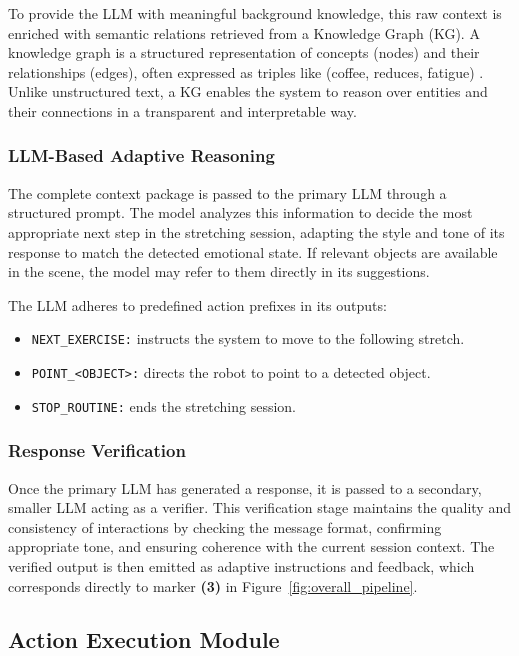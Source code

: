 To provide the LLM with meaningful background knowledge, this raw context is enriched with semantic relations retrieved from a Knowledge Graph (KG). A knowledge graph is a structured representation of concepts (nodes) and their relationships (edges), often expressed as triples like (coffee, reduces, fatigue) \cite{ref26}. Unlike unstructured text, a KG enables the system to reason over entities and their connections in a transparent and interpretable way.

\subsubsection{LLM-Based Adaptive Reasoning}

The complete context package is passed to the primary LLM through a structured prompt. The model analyzes this information to decide the most appropriate next step in the stretching session, adapting the style and tone of its response to match the detected emotional state. If relevant objects are available in the scene, the model may refer to them directly in its suggestions.

The LLM adheres to predefined action prefixes in its outputs:
\begin{itemize}
\item \texttt{NEXT\_EXERCISE:} instructs the system to move to the following stretch.
\item \texttt{POINT\_<OBJECT>:} directs the robot to point to a detected object.
\item \texttt{STOP\_ROUTINE:} ends the stretching session.
\end{itemize}

\subsubsection{Response Verification}

Once the primary LLM has generated a response, it is passed to a secondary, smaller LLM acting as a verifier. This verification stage maintains the quality and consistency of interactions by checking the message format, confirming appropriate tone, and ensuring coherence with the current session context. The verified output is then emitted as adaptive instructions and feedback, which corresponds directly to marker \textbf{(3)} in Figure~\ref{fig:overall_pipeline}.

\subsection{Action Execution Module}

